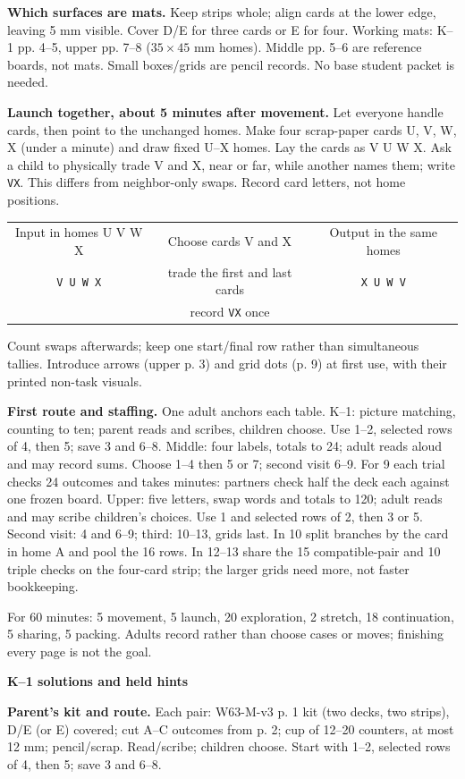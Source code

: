 \documentclass[11pt]{article}
\newcommand{\head}[1]{\par\textbf{\large #1}\par}
\newcommand{\row}[1]{\texttt{#1}}
\begin{document}
\textbf{Which surfaces are mats.} Keep strips whole; align cards at the lower edge, leaving 5 mm visible. Cover D/E for three cards or E for four. Working mats: K--1 pp. 4--5, upper pp. 7--8 ($35\times45$ mm homes). Middle pp. 5--6 are reference boards, not mats. Small boxes/grids are pencil records. No base student packet is needed.

\textbf{Launch together, about 5 minutes after movement.} Let everyone handle cards, then point to the unchanged homes. Make four scrap-paper cards U, V, W, X (under a minute) and draw fixed U--X homes. Lay the cards as V U W X. Ask a child to physically trade V and X, near or far, while another names them; write \row{VX}. This differs from neighbor-only swaps. Record card letters, not home positions.
\begin{center}\small
\begin{tabular}{ccc}
Input in homes U V W X & Choose cards V and X & Output in the same homes\\[3pt]
\row{V U W X} & trade the first and last cards & \row{X U W V}\\
 & record \row{VX} once &
\end{tabular}
\end{center}
Count swaps afterwards; keep one start/final row rather than simultaneous tallies. Introduce arrows (upper p. 3) and grid dots (p. 9) at first use, with their printed non-task visuals.

\textbf{First route and staffing.} One adult anchors each table. K--1: picture matching, counting to ten; parent reads and scribes, children choose. Use 1--2, selected rows of 4, then 5; save 3 and 6--8. Middle: four labels, totals to 24; adult reads aloud and may record sums. Choose 1--4 then 5 or 7; second visit 6--9. For 9 each trial checks 24 outcomes and takes minutes: partners check half the deck each against one frozen board. Upper: five letters, swap words and totals to 120; adult reads and may scribe children's choices. Use 1 and selected rows of 2, then 3 or 5. Second visit: 4 and 6--9; third: 10--13, grids last. In 10 split branches by the card in home A and pool the 16 rows. In 12--13 share the 15 compatible-pair and 10 triple checks on the four-card strip; the larger grids need more, not faster bookkeeping.

For 60 minutes: 5 movement, 5 launch, 20 exploration, 2 stretch, 18 continuation, 5 sharing, 5 packing. Adults record rather than choose cases or moves; finishing every page is not the goal.
\newpage
\head{K--1 solutions and held hints}
\textbf{Parent's kit and route.} Each pair: W63-M-v3 p. 1 kit (two decks, two strips), D/E (or E) covered; cut A--C outcomes from p. 2; cup of 12--20 counters, at most 12 mm; pencil/scrap. Read/scribe; children choose. Start with 1--2, selected rows of 4, then 5; save 3 and 6--8.
\end{document}
